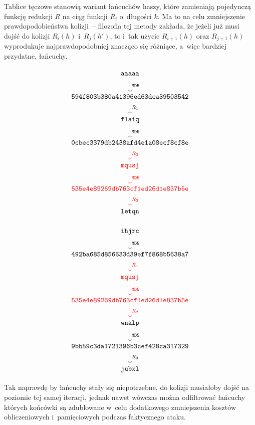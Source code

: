Tablice tęczowe stanowią wariant łańcuchów haszy, które zamieniają pojedynczą
funkcję redukcji $R$ na ciąg funkcji $R_i$ o~długości $k$. Ma to na celu
zmniejszenie prawdopodobieństwa kolizji~-- filozofia tej metody zakłada, że
jeżeli już musi dojść do kolizji $R_i(h)$ i~$R_j(h')$, to i~tak użycie
$R_{i+1}(h)$ oraz $R_{j+1}(h)$ wyprodukuje najprawdopodobniej znacząco się
różniące, a~więc bardziej przydatne, łańcuchy.

\pagebreak
\begin{multicols}{2}
\begingroup
    \[
    \begin{tikzcd}
        \mathtt{aaaaa\tmp} \arrow{d}{\mathtt{MD5}} \\
        \mathtt{594f803b380a41396ed63dca39503542} \arrow{d}{R_1} \\
        \mathtt{flaiq\tmp} \arrow{d}{\mathtt{MD5}} \\
        \mathtt{0cbec3379db2438afd4e1a08ecf8cf8e} \arrow[color=red]{d}{R_2} \\
        \mathtt{\textcolor{red}{mqusj\tmp}} \arrow[color=red]{d}{\mathtt{MD5}} \\
        \mathtt{\textcolor{red}{535e4e89269db763cf1ed26d1e837b5e}} \arrow[color=red]{d}{R_3} \\
        \mathtt{letqn\tmp}
    \end{tikzcd}
    \]
\endgroup

\begingroup
    \[
    \begin{tikzcd}
        \mathtt{ihjrc\tmp} \arrow{d}{\mathtt{MD5}} \\
        \mathtt{492ba685d856633d39ef7f868b5638a7} \arrow[color=red]{d}{R_1} \\
        \mathtt{\textcolor{red}{mqusj\tmp}} \arrow[color=red]{d}{\mathtt{MD5}} \\
        \mathtt{\textcolor{red}{535e4e89269db763cf1ed26d1e837b5e}} \arrow[color=red]{d}{R_2} \\
        \mathtt{wnalp\tmp} \arrow{d}{\mathtt{MD5}} \\
        \mathtt{9bb59c3da1721396b3cef428ca317329} \arrow{d}{R_3} \\
        \mathtt{jubxl\tmp}
    \end{tikzcd}
    \]
\endgroup
\end{multicols}

Tak naprawdę by łańcuchy stały się niepotrzebne, do kolizji musiałoby dojść
na poziomie tej samej iteracji, jednak nawet wówczas można odfiltrować łańcuchy
których końcówki są zdublowane w~celu dodatkowego zmniejszenia kosztów
obliczeniowych i~pamięciowych podczas faktycznego ataku.

